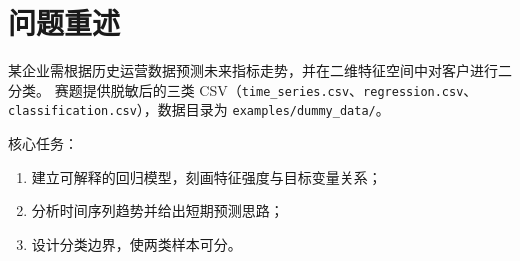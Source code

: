 \section{问题重述}

某企业需根据历史运营数据预测未来指标走势，并在二维特征空间中对客户进行二分类。
赛题提供脱敏后的三类 CSV（\texttt{time\_series.csv}、\texttt{regression.csv}、\texttt{classification.csv}），数据目录为 \mbox{\texttt{examples/dummy\_data/}}。

核心任务：
\begin{enumerate}
  \item 建立可解释的回归模型，刻画特征强度与目标变量关系；
  \item 分析时间序列趋势并给出短期预测思路；
  \item 设计分类边界，使两类样本可分。
\end{enumerate}


